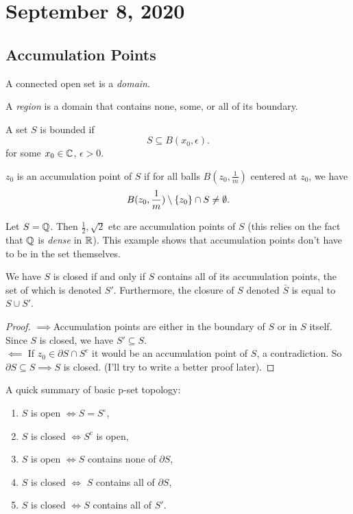 \section{September 8, 2020}
\subsection{Accumulation Points}
\begin{definition}
    A connected open set is a \emph{domain}.
\end{definition}
\begin{definition}
    A \emph{region} is a domain that contains none, some, or all of its boundary. 
\end{definition}
\begin{definition}
    A set $S$ is bounded if \[
        S \subseteq B(x_0,\epsilon).
    \] for some $x_0\in \mathbb{C}$, $\epsilon>0$.
\end{definition}
\begin{definition}
    $z_0$ is an accumulation point of $S$ if for all balls $B(z_0,\frac{1}{m})$ centered at $z_0$, we have \[
    B(z_0,\frac{1}{m})\setminus \{z_0\} \cap S \neq \emptyset.
    \]
\end{definition}
\begin{example}
    Let $S=\mathbb{Q}$. Then $\frac{1}{2},\sqrt{2} $ etc are accumulation points of $S$ (this relies on the fact that $\mathbb{Q}$ is \emph{dense} in $\mathbb{R}$). This example shows that accumulation points don't have to be in the set themselves.
\end{example}
\begin{theorem}
    We have $S$ is closed if and only if $S$ contains all of its accumulation points, the set of which is denoted $S'$. Furthermore, the closure of $S$ denoted $\bar{S}$ is equal to $S\cup S'$.
\end{theorem}
\begin{proof}
    $\implies $Accumulation points are either in the boundary of $S$ or in $S$ itself. Since $S$ is closed, we have $S'\subseteq S$.\\
    $\impliedby$ If $z_0\in \partial S \cap S^{c}$ it would be an accumulation point of $S$, a contradiction. So $\partial S \subseteq S\implies S$ is closed. (I'll try to write a better proof later).
\end{proof}
A quick summary of basic p-set topology:
\begin{enumerate}
    \item $S$ is open $\iff S=S^{\circ}$,
    \item $S$ is closed $\iff S^{c}$ is open,
    \item $S$ is open $\iff S$ contains none of $\partial S$,
    \item $S$ is closed $\iff $ $S$ contains all of $\partial S$,
    \item $S$ is closed  $\iff S$ contains all of $S'$.
\end{enumerate}

